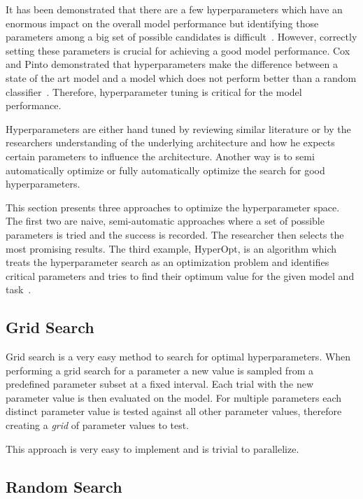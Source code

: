 It has been demonstrated that there are a few hyperparameters which have an enormous impact on the overall model performance but identifying those parameters among a big set of possible candidates is difficult~\cite{Bergstra2012a}. However, correctly setting these parameters is crucial for achieving a good model performance. Cox and Pinto demonstrated that hyperparameters make the difference between a state of the art model and a model which does not perform better than a random classifier~\cite{Cox2011}. Therefore, hyperparameter tuning is critical for the model performance.

Hyperparameters are either hand tuned by reviewing similar literature or by the researchers understanding of the underlying architecture and how he expects certain parameters to influence the architecture. Another way is to semi automatically optimize or fully automatically optimize the search for good hyperparameters.

This section presents three approaches to optimize the hyperparameter space. The first two are naive, semi-automatic approaches where a set of possible parameters is tried and the success is recorded. The researcher then selects the most promising results. The third example, HyperOpt, is an algorithm which treats the hyperparameter search as an optimization problem and identifies critical parameters and tries to find their optimum value for the given model and task~\cite{Bergstra2013}.



\subsection{Grid Search}

Grid search is a very easy method to search for optimal hyperparameters. When performing a grid search for a parameter a new value is sampled from a predefined parameter subset at a fixed interval. Each trial with the new parameter value is then evaluated on the model. For multiple parameters each distinct parameter value is tested against all other parameter values, therefore creating a \textit{grid} of parameter values to test.

This approach is very easy to implement and is trivial to parallelize.

\subsection{Random Search}

